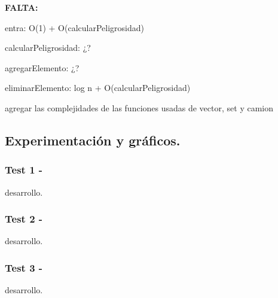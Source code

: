 \textbf{FALTA:}

entra: O(1) + O(calcularPeligrosidad)

calcularPeligrosidad: ¿?

agregarElemento: ¿?

eliminarElemento: log n + O(calcularPeligrosidad)

agregar las complejidades de las funciones usadas de vector, set y camion

\vspace*{0.75cm} \noindent



\subsection{Experimentación y gráficos.}

\vspace*{0.3cm}

\subsubsection{Test 1 - }

desarrollo.


\vspace*{0.5cm}


\subsubsection{Test 2 - }

desarrollo.


\vspace*{0.5cm}

\subsubsection{Test 3 - }

desarrollo.


